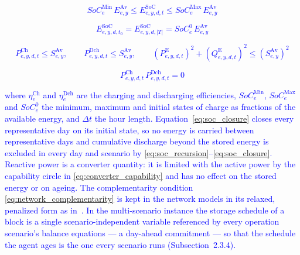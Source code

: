 \textcolor{blue}{
    \begin{equation}
        SoC^{\text{Min}}_e \, E^{\text{Av}}_{e,y} \le E^{\text{SoC}}_{e,y,d,t} \le SoC^{\text{Max}}_e \, E^{\text{Av}}_{e,y}
        \label{eq:soc_limits}
    \end{equation}
}

\textcolor{blue}{
    \begin{equation}
        E^{\text{SoC}}_{e,y,d,t_0} = E^{\text{SoC}}_{e,y,d,|T|} = SoC^{0}_e \, E^{\text{Av}}_{e,y}
        \label{eq:soc_closure}
    \end{equation}
}

\textcolor{blue}{
    \begin{equation}
        P^{\text{Ch}}_{e,y,d,t} \le S^{\text{Av}}_{e,y}, \qquad
        P^{\text{Dch}}_{e,y,d,t} \le S^{\text{Av}}_{e,y}, \qquad
        \left(P^{\text{E}}_{e,y,d,t}\right)^2 + \left(Q^{\text{E}}_{e,y,d,t}\right)^2 \le \left(S^{\text{Av}}_{e,y}\right)^2
        \label{eq:converter_capability}
    \end{equation}
}

\textcolor{blue}{
    \begin{equation}
        P^{\text{Ch}}_{e,y,d,t} \, P^{\text{Dch}}_{e,y,d,t} = 0
        \label{eq:network_complementarity}
    \end{equation}
}

\noindent
\textcolor{blue}{where $\eta^{\text{Ch}}_e$ and $\eta^{\text{Dch}}_e$ are the charging and discharging
efficiencies, $SoC^{\text{Min}}_e$, $SoC^{\text{Max}}_e$ and $SoC^{0}_e$ the minimum, maximum and initial states
of charge as fractions of the available energy, and $\Delta t$ the hour length. Equation~\eqref{eq:soc_closure}
closes every representative day on its initial state, so no energy is carried between representative days and
cumulative discharge beyond the stored energy is excluded in every day and scenario by
\eqref{eq:soc_recursion}--\eqref{eq:soc_closure}. Reactive power is a converter quantity: it is limited with
the active power by the capability circle in \eqref{eq:converter_capability} and has no effect on the stored
energy or on ageing. The complementarity condition \eqref{eq:network_complementarity} is kept in the network
models in its relaxed, penalized form as in~\cite{simoes_2023}. In the multi-scenario instance the storage
schedule of a block is a single scenario-independent variable referenced by every operation scenario's
balance equations --- a day-ahead commitment --- so that the schedule the agent ages is the one every
scenario runs (Subsection~2.3.4).}

